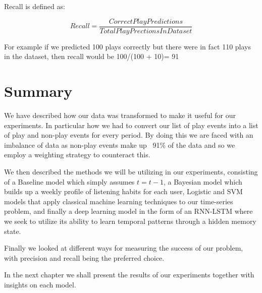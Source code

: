 Recall is defined as:

$$Recall = \frac{CorrectPlayPredictions}{TotalPlayPrectionsInDataset}$$

For example if we predicted 100 plays correctly but there were in fact 110 plays in the dataset, then recall would be 100/(100 + 10)= 91%


\section{Summary}

We have described how our data was transformed to make it useful for our experiments. In particular how we had to convert our list of play events into a list of play and non-play events for every period. By doing this we are faced with an imbalance of data as non-play events make up ~91\% of the data and so we employ a weighting strategy to counteract this.

We then described the methods we will be utilizing in our experiments, consisting of a Baseline model which simply assumes $t =t-1$, a Bayesian model which builds up a weekly profile of listening habits for each user, Logistic and SVM models that apply classical machine learning techniques to our time-series problem, and finally a deep learning model in the form of an RNN-LSTM where we seek to utilize its ability to learn temporal patterns through a hidden memory state.

Finally we looked at different ways for measuring the success of our problem, with precision and recall being the preferred choice.

In the next chapter we shall present the results of our experiments together with insights on each model.